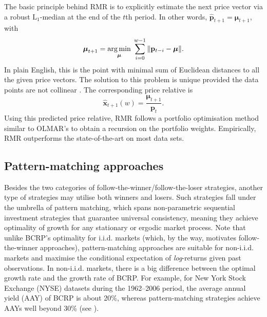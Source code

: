 The basic principle behind RMR is to explicitly estimate the next price vector via a robust $\mathrm{L}_1$-median at the end of the $t$th period. In other words, $\widehat{\mathbf{p}}_{t+1} = \boldsymbol{\mu}_{t+1}$, with
\begin{equation}
	\boldsymbol{\mu}_{t+1}
	 = \operatorname*{arg\,min}_{\boldsymbol{\mu}} \; \sum_{i=0}^{w-1} \Vert\mathbf{p}_{t-i} - \boldsymbol{\mu}\Vert.
\end{equation}
In plain English, this is the point with minimal sum of Euclidean distances to all the given price vectors. The solution to this problem is unique provided the data points are not collinear \citep{weiszfeld37}. The corresponding price relative is
\begin{equation}
	\widehat{\mathbf{x}}_{t+1}(w) = \frac{\boldsymbol{\mu}_{t+1}}{\mathbf{p}_t}.
\end{equation}
Using this predicted price relative, RMR follows a portfolio optimisation method similar to OLMAR's to obtain a recursion on the portfolio weights. Empirically, RMR outperforms the state-of-the-art on most data sets.




\subsection{Pattern-matching approaches}
\label{sec:pattern-matching}

Besides the two categories of follow-the-winner/follow-the-loser strategies, another type of strategies may utilise both winners and losers. Such strategies fall under the umbrella of pattern matching, which spans non-parametric sequential investment strategies that guarantee universal consistency, meaning they achieve optimality of growth for any stationary or ergodic market process. Note that unlike BCRP's optimality for i.i.d. markets (which, by the way, motivates follow-the-winner approaches), pattern-matching approaches are suitable for non-i.i.d. markets and maximise the conditional expectation of \emph{log}-returns given past observations. In non-i.i.d. markets, there is a big difference between the optimal growth rate and the growth rate of BCRP. For example, for New York Stock Exchange (NYSE) datasets during the 1962--2006 period, the average annual yield (AAY) of BCRP is about 20\%, whereas pattern-matching strategies achieve AAYs well beyond 30\% (see \citep[Chapter~2]{gyorfi12}).

